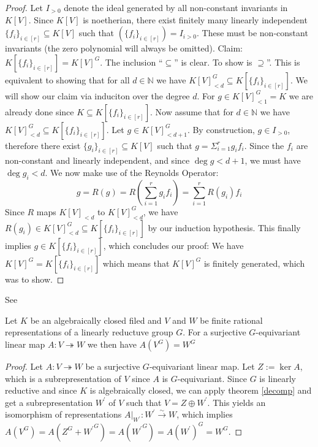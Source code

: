 \begin{proof}
  Let $I_{>0}$ denote the ideal generated by all non-constant invariants in $K[V]$.
  Since $K[V]$ is noetherian, there exist finitely many linearly independent $\{f_i\}_{i \in [r]} \subseteq K[V]$ such that $ \left( \{f_i\}_{i \in [r]} \right) = I_{i>0} $.
  These must be non-constant invariants (the zero polynomial will always be omitted).
  Claim: $K[\{f_i\}_{i \in [r]}] = K[V]^G$.
  The inclusion ``$\subseteq$'' is clear.
  To show is $\supseteq$''.
  This is equivalent to showing that for all $d \in \mathbb{N}$ we have $K[V]^G_{<d} \subseteq K[\{f_i\}_{i \in [r]}] $.
  We will show our claim via induciton over the degree $d$.
  For $g \in K[V]^G_{<1} = K$ we are already done since $K \subseteq K[\{f_i\}_{i \in [r]}]$.
  Now assume that for $d \in \mathbb{N}$ we have $K[V]^G_{<d} \subseteq K[\{f_i\}_{i \in [r]}]$.
  Let $g \in K[V]^G_{< d+1}$.
  By construction, $g \in I_{>0}$, therefore there exist $\{g_i\}_{i \in [r]} \subseteq K[V]$ such that $g = \Sigma_{i=1}^r g_i f_i$.
  Since the $f_i$ are non-constant and linearly independent, and since $\operatorname{deg} g < d+1$, we must have $ \operatorname{deg} g_i < d $.
  We now make use of the Reynolds Operator:
  \begin{equation}
      g = R(g)
      =  R \left( \sum_{i=1}^r g_i f_i \right)
      = \sum_{i=1}^r R( g_i) f_i
  \end{equation}
  Since $R$ maps $K[V]_{<d}$ to $K[V]^G_{<d}$, we have $R(g_i) \in K[V]^G_{<d} \subseteq K[\{f_i\}_{i \in [r]}]$ by our induction hypothesis.
  This finally implies $ g \in K[\{f_i\}_{i \in [r]}]$, which concludes our proof:
  We have $K[V]^G = K[\{f_i\}_{i \in [r]}]$ which means that $K[V]^G$ is finitely generated, which was to show.
\end{proof}

\begin{lemma}\label{bloblo}
  See \cite[2.2.8]{DK15}

  Let $K$ be an algebraically closed filed and $V$ and $W$ be finite rational representations of a linearly reductuve group $G$.
  For a surjective $G$-equivariant linear map $A \colon V \twoheadrightarrow W$ we then have $A(V^G) = W^G$
\end{lemma}

\begin{proof}
  Let $A \colon V \twoheadrightarrow W$ be a surjective $G$-equivariant linear map.
  Let $Z := \operatorname{ker}A$, which is a subrepresentation of $V$ since $A$ is $G$-equivariant.
  Since $G$ is linearly reductive and since $K$ is algebraically closed, we can apply theorem \ref{decomp} and get a subrepresentation $W^\prime$ of $V$ such that $V = Z \oplus W^\prime$.
  This yields an isomorphism of representations $\left. A \right|_{W^\prime} \colon W^\prime \xrightarrow{\sim} W$, which implies $A(V^G) = A(Z^G + {W^\prime}^G) = A({W^\prime}^G) = A(W^\prime)^G = W^G$.
\end{proof}


